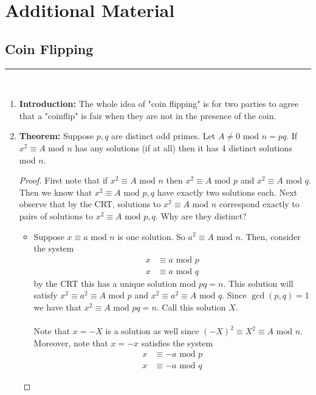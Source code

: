 \documentclass[class=article, crop=false]{standalone}
\begin{document}
\setcounter{section}{11}
\section{Additional Material}

\subsection{Coin Flipping}
\rule{\textwidth}{1pt}\\
\begin{enumerate}
	\item \textbf{Introduction:} 
	The whole idea of "coin flipping" is for two parties to agree that a "coinflip"
	is fair when they are not in the presence of the coin.

	\item \textbf{Theorem:}
	Suppose $p,q$ are distinct odd primes. Let $A\neq0\mbox{ mod }n=pq$.
	If $x^2\equiv A\mbox{ mod }n$ has any solutions (if at all) then it has
	4 distinct solutions mod $n$.
	\begin{proof}
		First note that if $x^2\equiv A\mbox{ mod }n$ then $x^2\equiv A\mbox{ mod }p$
		and $x^2\equiv A\mbox{ mod }q$. Then we know that $x^2\equiv A\mbox{ mod }p,q$
		have exactly two solutions each. Next observe that by the
		CRT, solutions to $x^2\equiv A\mbox{ mod }n$ correspond exactly to pairs
		of solutions to $x^2\equiv A\mbox{ mod }p, q$. Why are they distinct? 
		\begin{itemize}
		\item Suppose $x\equiv a\mbox{ mod } n$ is one solution.
		So $a^2\equiv A\mbox{ mod }n$. Then, consider the system
		\begin{align*}
			x&\equiv a\mbox{ mod }p \\
			x&\equiv a\mbox{ mod }q
		\end{align*}
		by the CRT this has a unique solution mod $pq=n$. This solution will
		satisfy $x^2\equiv a^2\equiv A\mbox{ mod }p$ and $x^2\equiv a^2\equiv A\mbox{ mod }q$.
		Since $\gcd(p,q)=1$ we have that $x^2\equiv A\mbox{ mod }pq=n$.
		Call this solution $X$. \\\\
		Note that $x=-X$ is a solution as well since $(-X)^2\equiv X^2\equiv A\mbox{ mod }n$.
		Moreover, note that $x=-x$ satisfies the system
		\begin{align*}
			x&\equiv -a\mbox{ mod }p \\
			x&\equiv -a\mbox{ mod }q
		\end{align*}


\end{itemize}
\end{proof}
\end{enumerate}
\end{document}
